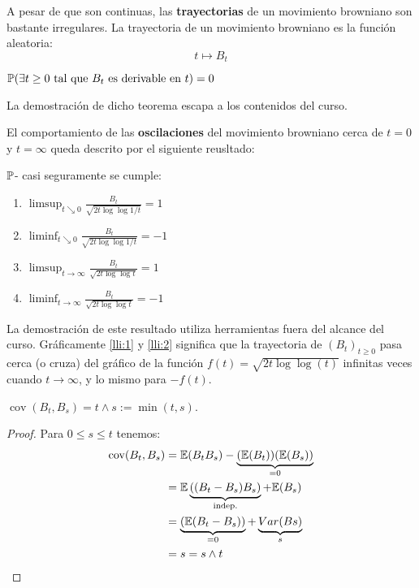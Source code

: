 A pesar de que son continuas, las \textbf{trayectorias} de un movimiento browniano son bastante irregulares. La trayectoria de un movimiento browniano es la función aleatoria:
 \begin{equation*}
         t \mapsto B_t
 \end{equation*}

 \begin{theorem}
         $\P( \exists t \geq 0 \text{ tal que } B_t \text{ es derivable en } t) = 0$
 \end{theorem}

 La demostración de dicho teorema escapa a los contenidos del curso. 

\newp El comportamiento de las \textbf{oscilaciones} del movimiento browniano cerca de $t=0$ y $t=\infty$ queda 
 descrito por el siguiente reusltado:

 \begin{theorem}
         $\P$- casi seguramente se cumple:
        \renewcommand{\labelenumi}{\roman{enumi})}
         \begin{enumerate}
                 \item \label{lli:1} $\limsup_{t \searrow 0} \frac{B_t}{\sqrt{ 2t \log \log {1/t}}} = 1$
                 \item \label{lli:2} $\liminf_{t \searrow 0} \frac{B_t}{\sqrt{ 2t \log \log {1/t}}} = -1$
                 \item \label{lli:3} $\limsup_{t \rightarrow \infty} \frac{B_t}{\sqrt{ 2t \log \log {t}}} = 1$
                 \item \label{lli:4} $\liminf_{t \rightarrow \infty} \frac{B_t}{\sqrt{ 2t \log \log {t}}} = -1$
         \end{enumerate}
 \end{theorem}

\newp La demostración de este resultado utiliza herramientas fuera del alcance del curso. Gráficamente  \ref{lli:1}
 y \ref{lli:2} significa que la trayectoria de $(B_{t})_{t \geq 0}$ pasa cerca (o cruza) del gráfico de la 
 función $f(t) = \sqrt{2t \log \log (t)} $ infinitas veces cuando $t \rightarrow \infty$, y lo mismo para 
 $-f(t)$. 


 \begin{proposition}
         $\operatorname{cov}(B_t,B_s) = t \wedge s := \min(t,s)$. 
 \end{proposition}

\begin{proof}
\gris
 Para $0 \leq s \leq t$ tenemos: 
\begin{align*}
     \operatorname{cov}(B_t, B_s)
     &= \E (B_t B_s) - \underbrace{(\E (B_t))(\E (B_s))}_{= 0} \\
     &= \E \underbrace{((B_t - B_s)B_s)}_{\text{indep.}} + \E(B_s) \\
     &= \underbrace{\left( \E(B_t - B_s) \right)}_{=0} + \underbrace{\var({Bs})}_{s}\\
     &= s = s \wedge t
\end{align*}
\findem
\negro
\end{proof}


